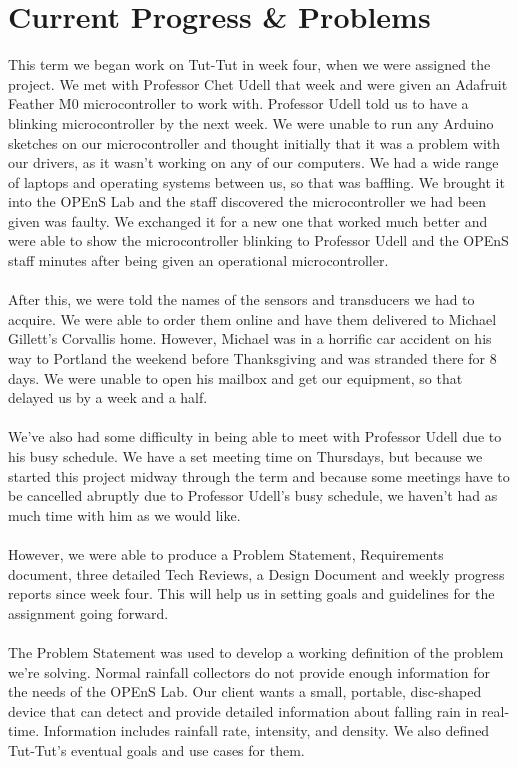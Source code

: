 \documentclass[letterpaper,10pt,draftclsnofoot,onecolumn]{article}
\begin{document}
\section{Current Progress \& Problems}
This term we began work on Tut-Tut in week four, when we were assigned the project. We met with Professor Chet Udell that week and were given an Adafruit Feather M0 microcontroller to work with. Professor Udell told us to have a blinking microcontroller by the next week. We were unable to run any Arduino sketches on our microcontroller and thought initially that it was a problem with our drivers, as it wasn't working on any of our computers. We had a wide range of laptops and operating systems between us, so that was baffling. We brought it into the OPEnS Lab and the staff discovered the microcontroller we had been given was faulty. We exchanged it for a new one that worked much better and were able to show the microcontroller blinking to Professor Udell and the OPEnS staff minutes after being given an operational microcontroller.
\\
\\
After this, we were told the names of the sensors and transducers we had to acquire. We were able to order them online and have them delivered to Michael Gillett's Corvallis home. However, Michael was in a horrific car accident on his way to Portland the weekend before Thanksgiving and was stranded there for 8 days. We were unable to open his mailbox and get our equipment, so that delayed us by a week and a half.
\\
\\
We've also had some difficulty in being able to meet with Professor Udell due to his busy schedule. We have a set meeting time on Thursdays, but because we started this project midway through the term and because some meetings have to be cancelled abruptly due to Professor Udell's busy schedule, we haven't had as much time with him as we would like.
\\
\\
However, we were able to produce a Problem Statement, Requirements document, three detailed Tech Reviews, a Design Document and weekly progress reports since week four. This will help us in setting goals and guidelines for the assignment going forward. 
\\
\\
The Problem Statement was used to develop a working definition of the problem we're solving. Normal rainfall collectors do not provide enough information for the needs of the OPEnS Lab. Our client wants a small, portable, disc-shaped device that can detect and provide detailed information about falling rain in real-time. Information includes rainfall rate, intensity, and density. We also defined Tut-Tut's eventual goals and use cases for them.
\end{document}
